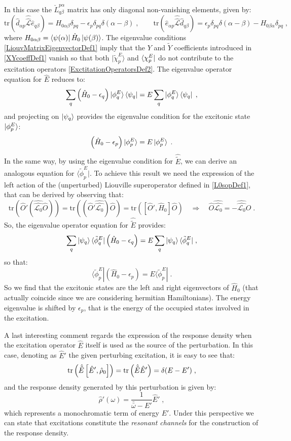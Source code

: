 \documentclass[a4paper]{article}
\newcommand{\eps}{\epsilon}
\newcommand{\bbomega}{{\bar{\bar\omega}}}
\newcommand{\be}{\begin{equation}}
\newcommand{\ee}{\end{equation}}
\newcommand{\nn}{\notag}
\newcommand{\qq}{\qquad}
\newcommand{\lb}{\label}
\newcommand{\op}[1]{\hat {#1}}
\newcommand{\sop}[1]{\op{\op {#1}}}
\newcommand{\commutator}[2]{\left[ {#1} , {#2} \right]}
\newcommand{\trace}[1]{\mathrm{tr}\left(#1\right)}
\newcommand{\optr}[1]{\check #1}
\newcommand{\tket}[1]{| \tilde #1 \rangle}
\newcommand{\tbra}[1]{\langle \tilde #1 |}
\newcommand{\dmnot}{\op{\rho}_0}
\newcommand{\dm}{\op{\rho}}
\newcommand{\hnot}{\op{H}_0}
\newcommand{\excite}[2]{\op e_{{#1}{#2}}}
\newcommand{\decay}[2]{\op d_{{#1}{#2}}}
\newcommand{\Liouv}{\sop{\mathcal L}}
\newcommand{\Liouvnot}{\sop{\mathcal L_0}}
\begin{document}
\noindent In this case the $\optr{L}_{q\beta}^{p\alpha}$ matrix has only diagonal non-vanishing elements, given by: 
\be
\trace{\decay{\alpha}{p}\Liouv\excite{q}{\beta}} = H_{0\alpha\beta}\delta_{pq} - \eps_p\delta_{pq}\delta(\alpha-\beta) \;, \qq
\trace{\excite{\alpha}{p}\Liouv\decay{q}{\beta}} = \eps_p\delta_{pq}\delta(\alpha-\beta) - H_{0\beta\alpha}\delta_{pq} \;, 
\ee
where $H_{0\alpha\beta} = \bra{\psi(\alpha)}\hnot\ket{\psi(\beta)}$. The eigenvalue conditions \eqref{LiouvMatrixEigenvectorDef1} imply
that the $Y$ and $\tilde Y$ coefficients introduced in \eqref{XYcoeffDef1} vanish so that both $\tket{\chi^E_p}$ and $\bra{\chi^E_p}$ do not
contribute to the excitation operators \eqref{ExctitationOperatorsDef2}. The eigenvalue operator equation for $\op E$ reduces to:
\be
\sum_q\left(\hnot - \eps_q\right)\ket{\phi^E_q}\bra{\psi_q} = E \sum_q \ket{\phi^E_q}\bra{\psi_q} \;,
\ee
and projecting on $\ket{\psi_q}$ provides the eigenvalue condition for the excitonic state $\ket{\phi^E_p}$:
\be
\left(\hnot - \eps_p\right)\ket{\phi^E_p} = E \ket{\phi^E_p} \;.
\ee
In the same way, by using the eigenvalue condition for $\op{\tilde E}$, we can derive an analogous equation for $\tbra{\phi^E_p}$. To achieve this
result we need the expression of the left action of the (unperturbed) Liouville superoperator defined in \eqref{L0sopDef1}, that can be derived by
observing that:
\be\lb{leftActionLouv0Def1}
\trace{\op O' (\Liouvnot \op O)} = \trace{(\op O' \Liouvnot) \op O } =
\trace{\commutator{\op O'}{\op H_0} \op O} \quad \Rightarrow \quad \op O \Liouvnot = 
- \Liouvnot \op O \;.
\ee
So, the eigenvalue operator equation for $\op{\tilde E}$ provides:
\be
\sum_q  \ket{\psi_q} \tbra{\phi^E_q} \left( \hnot - \eps_q \right) =
E \sum_q  \ket{\psi_q} \tbra{\phi^E_q} \;,
\ee
so that:
\be
\tbra{\phi^E_p} \left( \hnot - \eps_p \right) = E \tbra{\phi^E_p} \;.
\ee
So we find that the excitonic states are the left and right eigenvectors of $\hnot$ (that actually coincide since we are considering
hermitian Hamiltonians). The energy eigenvalue is shifted by $\eps_p$, that is the energy of the occupied states involved in the 
excitation. 

A last interesting comment regards the expression of the response density when the excitation operator $\op E$ itself is used as the source of the
perturbation. In this case, denoting as $\op E'$ the given perturbing excitation, it is easy to see that:
\be
\trace{\op{\tilde E}\commutator{\op E'}{\dmnot}} = \trace{\op{\tilde E}\op E'} = \delta(E-E') \;, \nn 
\ee
and the response density generated by this perturbation is given by: 
\be
\dm'(\omega) = \frac{1}{\bbomega - E'} \op E'\;,
\ee
which represents a monochromatic term of energy $E'$. Under this perspective we can state that excitations constitute
the \emph{resonant channels} for the construction  of the response density.
\end{document}
